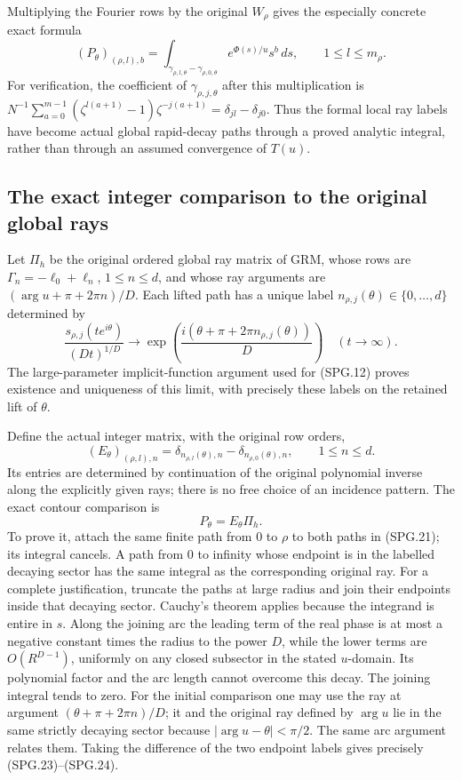 Multiplying the Fourier rows by the original \(W_\rho\) gives
the especially concrete exact formula
\[
 (P_\theta)_{(\rho,l),b}
    =\int_{\gamma_{\rho,l,\theta}-\gamma_{\rho,0,\theta}}
             e^{\Phi(s)/u}s^b\,ds,
       \qquad 1\le l\le m_\rho.
 \tag{SPG.21}\label{GraphV2:eq:spg-actual-local-cycles}
\]
For verification, the coefficient of \(\gamma_{\rho,j,\theta}\)
after this multiplication is
\(N^{-1}\sum_{a=0}^{m-1}
(\zeta^{l(a+1)}-1)\zeta^{-j(a+1)}
=\delta_{jl}-\delta_{j0}\).
Thus the formal local ray labels have become actual global
rapid-decay paths through a proved analytic integral, rather than
through an assumed convergence of \(T(u)\).

\subsection{The exact integer comparison to the original global rays}

Let \(\Pi_h\) be the original ordered global ray matrix of GRM,
whose rows are \(\Gamma_n=-\ell_0+\ell_n\), \(1\le n\le d\),
and whose ray arguments are
\((\arg u+\pi+2\pi n)/D\). Each lifted path has a unique
label \(n_{\rho,j}(\theta)\in\{0,\ldots,d\}\) determined by
\[
 \frac{s_{\rho,j}(t e^{i\theta})}{(Dt)^{1/D}}
    \longrightarrow
        \exp\left(\frac{i(\theta+\pi+2\pi n_{\rho,j}(\theta))}{D}\right)
                    \quad(t\longrightarrow\infty).
 \tag{SPG.22}\label{GraphV2:eq:spg-end-label}
\]
The large-parameter implicit-function argument used for (SPG.12)
proves existence and uniqueness of this limit, with precisely these
labels on the retained lift of \(\theta\).

Define the actual integer matrix, with the original row orders,
\[
 (E_\theta)_{(\rho,l),n}
    =\delta_{n_{\rho,l}(\theta),n}
                    -\delta_{n_{\rho,0}(\theta),n},
 \qquad 1\le n\le d.
 \tag{SPG.23}\label{GraphV2:eq:spg-incidence}
\]
Its entries are determined by continuation of the original polynomial
inverse along the explicitly given rays; there is no free choice of
an incidence pattern. The exact contour comparison is
\[
                    P_\theta=E_\theta\Pi_h.
 \tag{SPG.24}\label{GraphV2:eq:spg-global-comparison}
\]
To prove it, attach the same finite path from \(0\) to \(\rho\)
to both paths in (SPG.21); its integral cancels. A path from \(0\)
to infinity whose endpoint is in the labelled decaying sector has
the same integral as the corresponding original ray. For a complete
justification, truncate the paths at large radius and join their
endpoints inside that decaying sector. Cauchy's theorem applies
because the integrand is entire in \(s\). Along the joining arc
the leading term of the real phase is at most a negative constant
times the radius to the power \(D\), while the lower terms are
\(O(R^{D-1})\), uniformly on any closed subsector in the stated
\(u\)-domain. Its polynomial factor and the arc length cannot
overcome this decay. The joining integral tends to zero. For the
initial comparison one may use the ray at argument
\((\theta+\pi+2\pi n)/D\); it and the original ray defined by
\(\arg u\) lie in the same strictly decaying sector because
\(|\arg u-\theta|<\pi/2\). The same arc argument relates them.
Taking the difference of the two endpoint labels gives precisely
(SPG.23)--(SPG.24).

